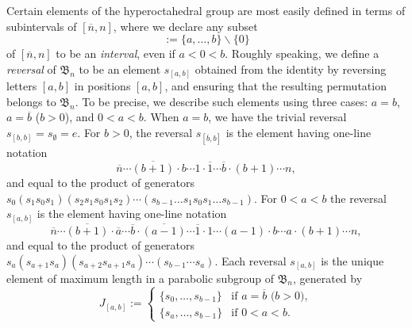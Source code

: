 \documentclass[12pt]{amsart}
\theoremstyle{definition}
\numberwithin{equation}{section}
\newcommand{\bn}{\mathfrak{B}_n}
\newcommand{\ol}[1]{\overline{#1}}
\newcommand{\defeq}{:=}
\newcommand{\ssm}{\smallsetminus}
\begin{document}
Certain elements of the hyperoctahedral group are most easily defined in terms of subintervals of $[\ol n, n]$, where we declare any subset 
\begin{equation*}
    [a,b] \defeq \{ a, \dotsc, b \} \ssm \{0 \}
\end{equation*}
 of $[\ol n,n]$ 
 to be 
 an {\em interval}, even if $a < 0 < b$.
Roughly speaking, we define a {\em reversal} of $\bn$ to be an element $s_{[a,b]}$ obtained from the identity by reversing letters $[a,b]$ in positions $[a,b]$, and ensuring that the resulting permutation belongs to $\bn$.
To be precise, we describe such elements using three cases: $a=b$, $a = \ol b$ ($b > 0$), and $0 < a < b$. When $a=b$, we have the trivial reversal $s_{[b,b]} = s_\emptyset = e$. %
For $b>0$, the reversal $s_{[\ol b,b]}$ is the element having one-line notation
\begin{equation}
 \ol n \cdots \ol{(b+1)} \cdot b \cdots 1 \cdot \ol 1 \cdots \ol b \cdot (b+1) \cdots n,
\end{equation}
and equal to the product of generators $s_0 (s_1 s_0 s_1)(s_2s_1s_0s_1s_2) \cdots (s_{b-1} \dotsc s_1 s_0 s_1 \dotsc s_{b-1})$. For $0 < a < b$ the reversal $s_{[a,b]}$ is the element having 
one-line notation
\begin{equation*}
\ol n \cdots \ol{(b+1)} \cdot \ol a \cdots \ol b \cdot \ol{(a-1)} \cdots \ol 1
\cdot 
1 \cdots (a-1) \cdot b \cdots a \cdot (b+1) \cdots n,
\end{equation*}
and equal to the product of generators $s_a (s_{a+1}s_a)(s_{a+2}s_{a+1}s_a) \cdots ( s_{b-1} \cdots s_a)$. Each reversal $s_{[a,b]}$ is the unique element of maximum length in a parabolic subgroup of $\bn$, generated by
\begin{equation}\label{eq:jabdef}
    J_{[a,b]} \defeq \begin{cases}
        \{ s_0, \dotsc, s_{b-1} \} &\text{if $a = \ol b$ ($b > 0$)},\\
        \{ s_a, \dotsc, s_{b-1} \} &\text{if $0 < a < b$}.
        \end{cases}
\end{equation}
\end{document}
